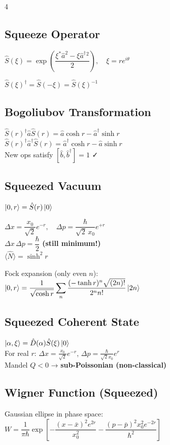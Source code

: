 \documentclass[10pt,landscape,a4paper]{article}
\newcommand{\aop}{\hat{a}}
\newcommand{\adop}{\hat{a}^{\dagger}}
\newcommand{\Nop}{\hat{N}}
\newcommand{\Dop}[1]{\hat{D}(#1)}
\newcommand{\Sop}[1]{\hat{S}(#1)}
\newcommand{\xzero}{x_0}
\begin{document}
\begin{multicols}{4}
\subsection{Squeeze Operator}
\begin{squeezedbox}
$\Sop{\xi} = \exp\!\left(\dfrac{\xi^*\aop^2 - \xi\adop{}^2}{2}\right),\quad\xi=re^{i\theta}$
\end{squeezedbox}

$\Sop{\xi}^\dagger = \Sop{-\xi} = \Sop{\xi}^{-1}$

\subsection{Bogoliubov Transformation}
$\Sop{r}^\dagger\aop\Sop{r} = \aop\cosh r - \adop\sinh r$\\[2pt]
$\Sop{r}^\dagger\adop\Sop{r} = \adop\cosh r - \aop\sinh r$\\[2pt]
New ops satisfy $[\hat{b},\hat{b}^\dagger] = 1$ ✓

\subsection{Squeezed Vacuum}
$\ket{0,r} = \Sop{r}\ket{0}$\\[2pt]
\begin{squeezedbox}
$\Delta x = \dfrac{\xzero}{\sqrt{2}}e^{-r},\quad\Delta p = \dfrac{\hbar}{\sqrt{2}\,\xzero}e^{+r}$\\[3pt]
$\Delta x\,\Delta p = \dfrac{\hbar}{2}$ \textbf{(still minimum!)}\\[3pt]
$\langle\Nop\rangle = \sinh^2 r$
\end{squeezedbox}

Fock expansion (only even $n$):\\
$\ket{0,r} = \dfrac{1}{\sqrt{\cosh r}}\displaystyle\sum_n \dfrac{(-\tanh r)^n\sqrt{(2n)!}}{2^n n!}\ket{2n}$

\subsection{Squeezed Coherent State}
$\ket{\alpha,\xi} = \Dop{\alpha}\Sop{\xi}\ket{0}$\\[2pt]
For real $r$: $\Delta x = \tfrac{\xzero}{\sqrt{2}}e^{-r}$, $\Delta p = \tfrac{\hbar}{\sqrt{2}\xzero}e^{r}$\\[2pt]
Mandel $Q < 0$ → \textbf{sub-Poissonian (non-classical)}

\subsection{Wigner Function (Squeezed)}
Gaussian ellipse in phase space:\\
$W = \dfrac{1}{\pi\hbar}\exp\!\!\left[-\dfrac{(x-\bar{x})^2e^{2r}}{\xzero^2} - \dfrac{(p-\bar{p})^2\xzero^2 e^{-2r}}{\hbar^2}\right]$


\end{multicols}
\end{document}
